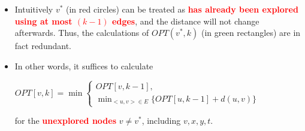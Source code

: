 \documentclass[mathserif]{beamer}
\begin{document}
{\begin{figure}
\begin{tikzpicture}[auto,swap,scale=0.65]
% 
%    
% 
% 

\end{tikzpicture} 
 
\end{figure}

\begin{itemize}
\item  Intuitively $v^*$ (in red circles) can be treated as \textcolor{red}{\bf has already been explored using at most $(k-1)$ edges}, and the distance will not change afterwards.
  Thus, the calculations of $OPT(v^*, k)$ (in green rectangles) are in fact redundant.
\item In other words, it suffices to calculate \begin{small} $OPT[v, k] = \min \begin{cases}
			OPT[v, k-1], \\
			\min_{<u,v>\in E} \{OPT[ u, k-1 ] + d(u,v) \} 
		\end{cases}$
		\end{small} for the \textcolor{red}{\bf unexplored nodes} $v \neq v^*$, including $v, x, y, t$. 
\end{itemize}
}
\end{document}
